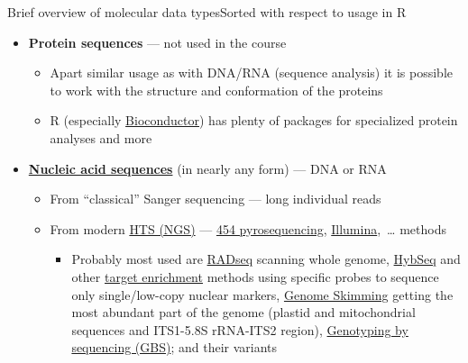 \documentclass[compress, ucs, xelatex, 11pt, xcolor=svgnames,
	hyperref={
		bookmarks=true,
		unicode=true,
		colorlinks=true,
		pdftitle={Molecular data in R},
		plainpages=false,
		pdfauthor={Vojtech Zeisek},
		pdfsubject={Course about phylogeny and evolution in R},
		pdfcreator={XeLaTeX},
		pdfkeywords={R, evolution, phylogeny, molecular data},
		linkcolor=Tomato,
		anchorcolor=SaddleBrown,
		citecolor=Goldenrod,
		filecolor=DarkMagenta,
		menucolor=Sienna,
		urlcolor=DarkTurquoise,
		pdftex},
	url={hyphens, lowtilde} %
	]{beamer}
\begin{document}
\begin{frame}[allowframebreaks]{Brief overview of molecular data types}{Sorted with respect to usage in R}
\begin{itemize}
\begin{itemize}
\begin{itemize}
				\item \href{https://en.wikipedia.org/wiki/Amplified_fragment_length_polymorphism}{AFLP} (Amplified Fragment Length Polymorphism) --- very variable, technically complicated, nowadays bit expensive and outdated
				\item Simpler methods \href{https://en.wikipedia.org/wiki/RAPD}{RAPD} (Random Amplified Polymorphic DNA) and \href{https://en.wikipedia.org/wiki/Restriction_fragment_length_polymorphism}{PCR-RFLP} (Polymerase Chain Reaction-Restriction Fragment Length Polymorphism) are not used anymore at all
			\end{itemize}
		\end{itemize}
		\item \textbf{Protein sequences} --- not used in the course
		\begin{itemize}
			\item Apart similar usage as with DNA/RNA (sequence analysis) it is possible to work with the structure and conformation of the proteins
			\item R (especially \href{https://bioconductor.org/}{Bioconductor}) has plenty of packages for specialized protein analyses and more
		\end{itemize}
		\item \textbf{\href{https://en.wikipedia.org/wiki/Nucleic_acid_sequence}{Nucleic acid sequences}} (in nearly any form) --- DNA or RNA
		\begin{itemize}
			\item From ``classical'' Sanger sequencing --- long individual reads
			\item From modern \href{https://en.wikipedia.org/wiki/DNA_sequencing\#High-throughput_methods}{HTS (NGS)} --- \href{https://en.wikipedia.org/wiki/Pyrosequencing}{454 pyrosequencing}, \href{https://en.wikipedia.org/wiki/Illumina_dye_sequencing}{Illumina},~\ldots{ }methods
			\begin{itemize}
				\item Probably most used are \href{https://en.wikipedia.org/wiki/Restriction_site_associated_DNA_markers}{RADseq} scanning whole genome, \href{https://bsapubs.onlinelibrary.wiley.com/doi/abs/10.3732/apps.1400042}{HybSeq} and other \href{https://en.wikipedia.org/wiki/Exome_sequencing}{target enrichment} methods using specific probes to sequence only single/low-copy nuclear markers, \href{https://bsapubs.onlinelibrary.wiley.com/doi/abs/10.3732/ajb.1100335}{Genome Skimming} getting the most abundant part of the genome (plastid and mitochondrial sequences and ITS1-5.8S rRNA-ITS2 region), \href{https://en.wikipedia.org/wiki/Genotyping_by_sequencing}{Genotyping by sequencing (GBS)}; and their variants

\end{itemize}
\end{itemize}
\end{itemize}
\end{frame}
\end{document}
